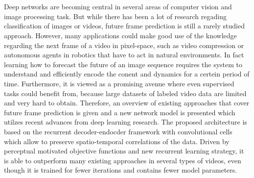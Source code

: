 \chapter{\abstractname}

Deep networks are becoming central in several areas of computer vision and image processing task. But while there has been a lot of research regading classification of images or videos, future frame prediction is still a rarely studied approach. However, many applications could make good use of the knowledge regarding the next frame of a video in pixel-space, such as video compression or autonomous agents in robotics that have to act in natural environments. In fact learning how to forecast the future of an image sequence requires the system to understand and efficiently encode the conent and dynamics for a certein period of time. Furthermore, it is viewed as a promising avenue where even supervised tasks could benefit from, because large datasets of labeled video data are limited and very hard to obtain. Therefore, an overview of existing approaches that cover future frame prediction is given and a new network model is presented which utilzes recent advances from deep learning research. The proposed architecture is based on the recurrent decoder-endocder framework with convolutional cells which allow to preserve spatio-temporal correlations of the data. Driven by perceptual motivated objective functions and new recurrent learning strategy, it is able to outperform many existing approaches in several types of videos, even though it is trained for fewer iterations and contains fewer model parameters.